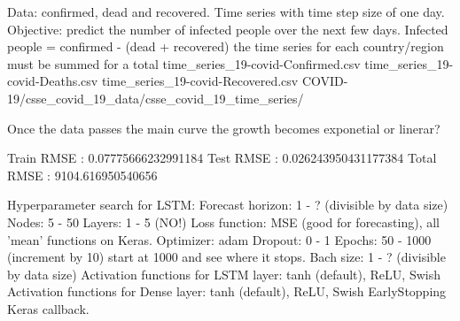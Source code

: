 Data: confirmed, dead and recovered. Time series with time step size of one day.
Objective: predict the number of infected people over the next few days.
Infected people = confirmed - (dead + recovered) {the time series for each country/region must be summed for a total}
time_series_19-covid-Confirmed.csv  time_series_19-covid-Deaths.csv  time_series_19-covid-Recovered.csv 
COVID-19/csse_covid_19_data/csse_covid_19_time_series/

Once the data passes the main curve the growth becomes exponetial or linerar?

Train RMSE : 0.07775666232991184
Test RMSE : 0.026243950431177384
Total RMSE : 9104.616950540656


Hyperparameter search for LSTM:
Forecast horizon: 1 - ? (divisible by data size)
Nodes: 5 - 50
Layers: 1 - 5 (NO!)
Loss function: MSE (good for forecasting), all 'mean' functions on Keras.
Optimizer: adam
Dropout:  0 - 1
Epochs: 50 - 1000 (increment by 10) start at 1000 and see where it stops.
Bach size: 1 - ? (divisible by data size)
Activation functions for LSTM layer: tanh (default), ReLU, Swish
Activation functions for Dense layer: tanh (default), ReLU, Swish
EarlyStopping Keras callback.
